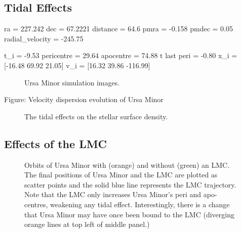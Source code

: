 \subsection{Tidal Effects}\label{tidal-effects-2}

ra = 227.242 dec = 67.2221 distance = 64.6 pmra = -0.158 pmdec = 0.05
radial\_velocity = -245.75

t\_i = -9.53 pericentre = 29.64 apocentre = 74.88 t last peri = -0.80
x\_i = {[}-16.48 69.92 21.05{]} v\_i = {[}16.32 39.86 -116.99{]}

\begin{figure}
\centering
{}
\caption[Ursa Minor simulation snapshots]{Ursa Minor simulation images.}
\end{figure}

Figure: Velocity dispersion evolution of Ursa Minor

\begin{figure}
\centering
{}
\caption[Ursa Minor simulated density profiles]{The tidal effects on the
stellar surface density.}
\end{figure}

\subsection{Effects of the LMC}\label{effects-of-the-lmc-1}

\begin{figure}
\centering
{}
\caption[Ursa Minor orbits with LMC]{Orbits of Ursa Minor with (orange)
and without (green) an LMC. The final positions of Ursa Minor and the
LMC are plotted as scatter points and the solid blue line represents the
LMC trajectory. Note that the LMC only increases Ursa Minor's peri and
apo-centres, weakening any tidal effect. Interestingly, there is a
change that Ursa Minor may have once been bound to the LMC (diverging
orange lines at top left of middle panel.)}
\end{figure}
